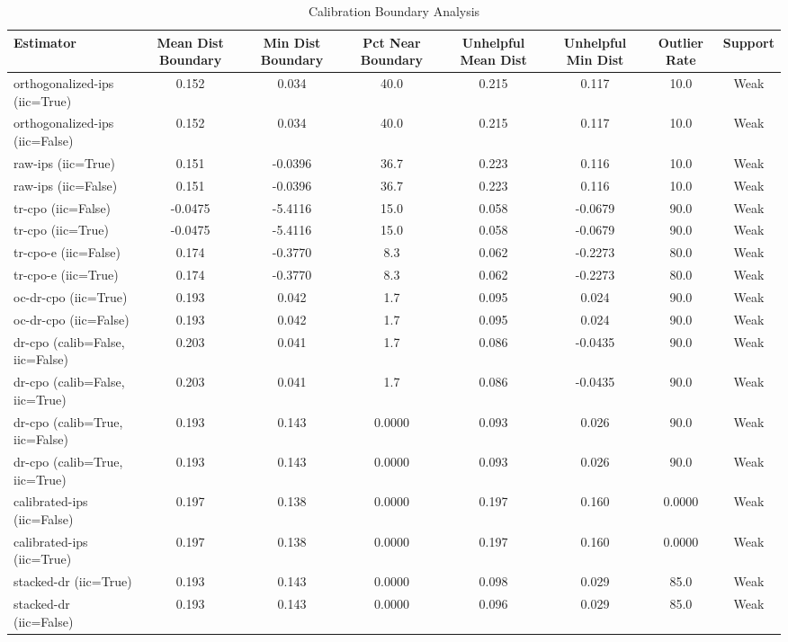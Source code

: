 \begin{table}[htbp]
\centering
\caption{Calibration Boundary Analysis}
\label{tab:A5}
\begin{tabular}{l|ccccccc}
\toprule
Estimator & Mean Dist Boundary & Min Dist Boundary & Pct Near Boundary & Unhelpful Mean Dist & Unhelpful Min Dist & Outlier Rate & Support \\
\midrule
orthogonalized-ips (iic=True) & 0.152 & 0.034 & 40.0 & 0.215 & 0.117 & 10.0 & Weak \\
orthogonalized-ips (iic=False) & 0.152 & 0.034 & 40.0 & 0.215 & 0.117 & 10.0 & Weak \\
raw-ips (iic=True) & 0.151 & -0.0396 & 36.7 & 0.223 & 0.116 & 10.0 & Weak \\
raw-ips (iic=False) & 0.151 & -0.0396 & 36.7 & 0.223 & 0.116 & 10.0 & Weak \\
tr-cpo (iic=False) & -0.0475 & -5.4116 & 15.0 & 0.058 & -0.0679 & 90.0 & Weak \\
tr-cpo (iic=True) & -0.0475 & -5.4116 & 15.0 & 0.058 & -0.0679 & 90.0 & Weak \\
tr-cpo-e (iic=False) & 0.174 & -0.3770 & 8.3 & 0.062 & -0.2273 & 80.0 & Weak \\
tr-cpo-e (iic=True) & 0.174 & -0.3770 & 8.3 & 0.062 & -0.2273 & 80.0 & Weak \\
oc-dr-cpo (iic=True) & 0.193 & 0.042 & 1.7 & 0.095 & 0.024 & 90.0 & Weak \\
oc-dr-cpo (iic=False) & 0.193 & 0.042 & 1.7 & 0.095 & 0.024 & 90.0 & Weak \\
dr-cpo (calib=False, iic=False) & 0.203 & 0.041 & 1.7 & 0.086 & -0.0435 & 90.0 & Weak \\
dr-cpo (calib=False, iic=True) & 0.203 & 0.041 & 1.7 & 0.086 & -0.0435 & 90.0 & Weak \\
dr-cpo (calib=True, iic=False) & 0.193 & 0.143 & 0.0000 & 0.093 & 0.026 & 90.0 & Weak \\
dr-cpo (calib=True, iic=True) & 0.193 & 0.143 & 0.0000 & 0.093 & 0.026 & 90.0 & Weak \\
calibrated-ips (iic=False) & 0.197 & 0.138 & 0.0000 & 0.197 & 0.160 & 0.0000 & Weak \\
calibrated-ips (iic=True) & 0.197 & 0.138 & 0.0000 & 0.197 & 0.160 & 0.0000 & Weak \\
stacked-dr (iic=True) & 0.193 & 0.143 & 0.0000 & 0.098 & 0.029 & 85.0 & Weak \\
stacked-dr (iic=False) & 0.193 & 0.143 & 0.0000 & 0.096 & 0.029 & 85.0 & Weak \\
\bottomrule
\end{tabular}
\end{table}